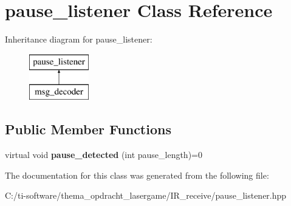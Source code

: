 \hypertarget{classpause__listener}{}\section{pause\+\_\+listener Class Reference}
\label{classpause__listener}
Inheritance diagram for pause\+\_\+listener\+:\begin{figure}[H]
\begin{center}
\leavevmode
\includegraphics[height=2.000000cm]{classpause__listener}
\end{center}
\end{figure}
\subsection*{Public Member Functions}
\begin{DoxyCompactItemize}
\item 
\mbox{\label{classpause__listener_a8c028680b7e4b26b7258417e0fb4cfca}} 
virtual void {\bfseries pause\+\_\+detected} (int pause\+\_\+length)=0
\end{DoxyCompactItemize}


The documentation for this class was generated from the following file\+:\begin{DoxyCompactItemize}
\item 
C\+:/ti-\/software/thema\+\_\+opdracht\+\_\+lasergame/\+I\+R\+\_\+receive/pause\+\_\+listener.\+hpp\end{DoxyCompactItemize}
